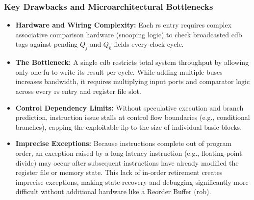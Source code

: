 \subsubsection{Key Drawbacks and Microarchitectural Bottlenecks}
\begin{itemize}
    \item \textbf{Hardware and Wiring Complexity:} Each \gls{rs} entry requires complex associative comparison hardware (snooping logic) to check broadcasted \gls{cdb} tags against pending $Q_j$ and $Q_k$ fields every clock cycle.
    \item \textbf{The  Bottleneck:} A single \gls{cdb} restricts total system throughput by allowing only one \gls{fu} to write its result per cycle. While adding multiple buses increases bandwidth, it requires multiplying input ports and comparator logic across every \gls{rs} entry and register file slot.
    \item \textbf{Control Dependency Limits:} Without speculative execution and branch prediction, instruction issue stalls at control flow boundaries (e.g., conditional branches), capping the exploitable \gls{ilp} to the size of individual basic blocks.
    \item \textbf{Imprecise Exceptions:} Because instructions complete out of program order, an exception raised by a long-latency instruction (e.g., floating-point divide) may occur after subsequent instructions have already modified the register file or memory state. This lack of in-order retirement creates imprecise exceptions, making state recovery and debugging significantly more difficult without additional hardware like a Reorder Buffer (\gls{rob}).
\end{itemize}